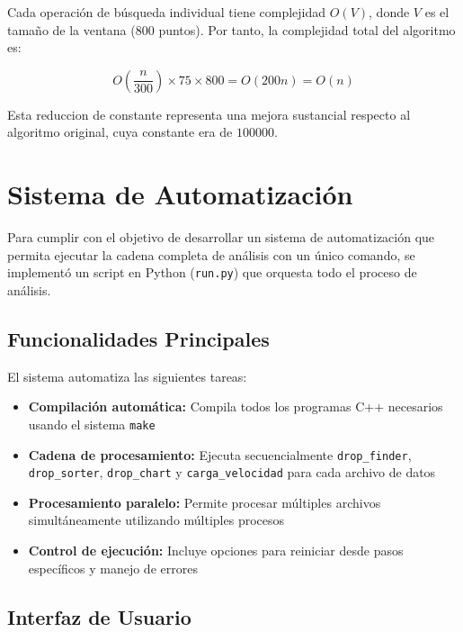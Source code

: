 \documentclass[12pt,a4paper]{article}
\begin{document}
Cada operación de búsqueda individual tiene complejidad $O(V)$, donde $V$ es el tamaño de la ventana (800 puntos). Por tanto, la complejidad total del algoritmo es:

$$O\left(\frac{n}{300}\right) \times 75 \times 800 = O(200n) = O(n)$$

Esta reduccion de constante representa una mejora sustancial respecto al algoritmo original, cuya constante era de $100000$.

\section{Sistema de Automatización}
\lhead{}

Para cumplir con el objetivo de desarrollar un sistema de automatización que permita ejecutar la cadena completa de análisis con un único comando, se implementó un script en Python (\texttt{run.py}) que orquesta todo el proceso de análisis.

\subsection{Funcionalidades Principales}

El sistema automatiza las siguientes tareas:

\begin{itemize}
    \item \textbf{Compilación automática:} Compila todos los programas C++ necesarios usando el sistema \texttt{make}
    
    \item \textbf{Cadena de procesamiento:} Ejecuta secuencialmente \texttt{drop\_finder}, \texttt{drop\_sorter}, \texttt{drop\_chart} y \texttt{carga\_velocidad} para cada archivo de datos
    
    \item \textbf{Procesamiento paralelo:} Permite procesar múltiples archivos simultáneamente utilizando múltiples procesos
    
    \item \textbf{Control de ejecución:} Incluye opciones para reiniciar desde pasos específicos y manejo de errores
\end{itemize}

\subsection{Interfaz de Usuario}
\end{document}
